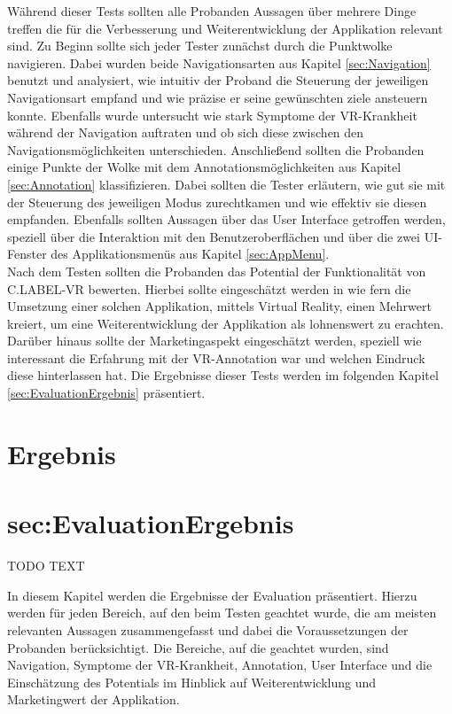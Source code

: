 Während dieser Tests sollten alle Probanden Aussagen über mehrere Dinge treffen die für die Verbesserung und Weiterentwicklung der Applikation relevant sind. Zu Beginn sollte sich jeder Tester zunächst durch die Punktwolke navigieren. Dabei wurden beide Navigationsarten aus Kapitel \ref{sec:Navigation} benutzt und analysiert, wie intuitiv der Proband die Steuerung der jeweiligen Navigationsart empfand und wie präzise er seine gewünschten ziele ansteuern konnte. Ebenfalls wurde untersucht wie stark Symptome der VR-Krankheit während der Navigation auftraten und ob sich diese zwischen den Navigationsmöglichkeiten unterschieden. Anschließend sollten die Probanden einige Punkte der Wolke mit dem Annotationsmöglichkeiten aus Kapitel \ref{sec:Annotation} klassifizieren. Dabei sollten die Tester erläutern, wie gut sie mit der Steuerung des jeweiligen Modus zurechtkamen und wie effektiv sie diesen empfanden. Ebenfalls sollten Aussagen über das User Interface getroffen werden, speziell über die Interaktion mit den Benutzeroberflächen und über die zwei UI-Fenster des Applikationsmenüs aus Kapitel \ref{sec:AppMenu}.\\

Nach dem Testen sollten die Probanden das Potential der Funktionalität von C.LABEL-VR bewerten. Hierbei sollte eingeschätzt werden in wie fern die Umsetzung einer solchen Applikation, mittels Virtual Reality, einen Mehrwert kreiert, um eine Weiterentwicklung der Applikation als lohnenswert zu erachten. Darüber hinaus sollte der Marketingaspekt eingeschätzt werden, speziell wie interessant die Erfahrung mit der VR-Annotation war und welchen Eindruck diese hinterlassen hat. Die Ergebnisse dieser Tests werden im folgenden Kapitel \ref{sec:EvaluationErgebnis} präsentiert.


\section{Ergebnis}
\section{sec:EvaluationErgebnis}
TODO TEXT

In diesem Kapitel werden die Ergebnisse der Evaluation präsentiert. Hierzu werden für jeden Bereich, auf den beim Testen geachtet wurde, die am meisten relevanten Aussagen zusammengefasst und dabei die Voraussetzungen der Probanden berücksichtigt. Die Bereiche, auf die geachtet wurden, sind Navigation, Symptome der VR-Krankheit, Annotation, User Interface und die Einschätzung des Potentials im Hinblick auf Weiterentwicklung und Marketingwert der Applikation. 

